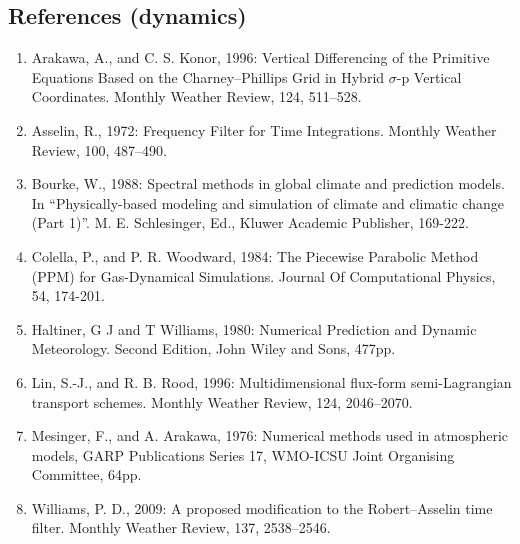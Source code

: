 \hypertarget{references-dynamics}{%
\subsection{References (dynamics)}\label{references-dynamics}}

\begin{enumerate}
\def\labelenumi{\arabic{enumi}.}
\item
  Arakawa, A., and C. S. Konor, 1996: Vertical Differencing of the
  Primitive Equations Based on the Charney--Phillips Grid in Hybrid
  $\sigma$-p Vertical Coordinates. Monthly Weather Review, 124,
  511--528.
\item
  Asselin, R., 1972: Frequency Filter for Time Integrations. Monthly
  Weather Review, 100, 487--490.
\item
  Bourke, W., 1988: Spectral methods in global climate and prediction
  models. In ``Physically-based modeling and simulation of climate and
  climatic change (Part 1)''. M. E. Schlesinger, Ed., Kluwer Academic
  Publisher, 169-222.
\item
  Colella, P., and P. R. Woodward, 1984: The Piecewise Parabolic Method
  (PPM) for Gas-Dynamical Simulations. Journal Of Computational Physics,
  54, 174-201.
\item
  Haltiner, G J and T Williams, 1980: Numerical Prediction and Dynamic
  Meteorology. Second Edition, John Wiley and Sons, 477pp.
\item
  Lin, S.-J., and R. B. Rood, 1996: Multidimensional flux-form
  semi-Lagrangian transport schemes. Monthly Weather Review, 124,
  2046--2070.
\item
  Mesinger, F., and A. Arakawa, 1976: Numerical methods used in
  atmospheric models, GARP Publications Series 17, WMO-ICSU Joint
  Organising Committee, 64pp.
\item
  Williams, P. D., 2009: A proposed modification to the Robert--Asselin
  time filter. Monthly Weather Review, 137, 2538--2546.
\end{enumerate}
